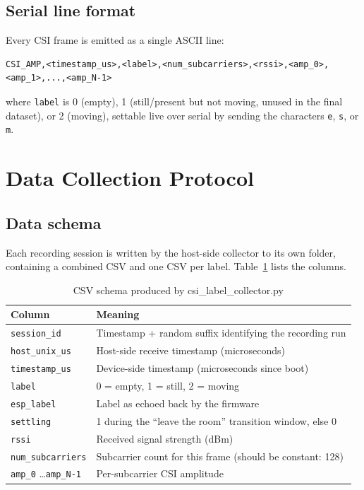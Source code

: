 \documentclass[11pt,a4paper]{article}
\begin{document}
\subsection{Serial line format}

Every CSI frame is emitted as a single ASCII line:

\begin{lstlisting}[caption={Firmware output format}]
CSI_AMP,<timestamp_us>,<label>,<num_subcarriers>,<rssi>,<amp_0>,<amp_1>,...,<amp_N-1>
\end{lstlisting}

where \texttt{label} is 0 (empty), 1 (still/present but not moving,
unused in the final dataset), or 2 (moving), settable live over serial
by sending the characters \texttt{e}, \texttt{s}, or \texttt{m}.

\section{Data Collection Protocol}

\subsection{Data schema}

Each recording session is written by the host-side collector to its own
folder, containing a combined CSV and one CSV per label. Table~\ref{tab:schema}
lists the columns.

\begin{table}[h]
\centering
\begin{tabular}{ll}
\toprule
\textbf{Column} & \textbf{Meaning} \\
\midrule
\texttt{session\_id} & Timestamp + random suffix identifying the recording run \\
\texttt{host\_unix\_us} & Host-side receive timestamp (microseconds) \\
\texttt{timestamp\_us} & Device-side timestamp (microseconds since boot) \\
\texttt{label} & 0 = empty, 1 = still, 2 = moving \\
\texttt{esp\_label} & Label as echoed back by the firmware \\
\texttt{settling} & 1 during the ``leave the room'' transition window, else 0 \\
\texttt{rssi} & Received signal strength (dBm) \\
\texttt{num\_subcarriers} & Subcarrier count for this frame (should be constant: 128) \\
\texttt{amp\_0} \ldots \texttt{amp\_N-1} & Per-subcarrier CSI amplitude \\
\bottomrule
\end{tabular}
\caption{CSV schema produced by csi\_label\_collector.py}
\label{tab:schema}
\end{table}
\end{document}
